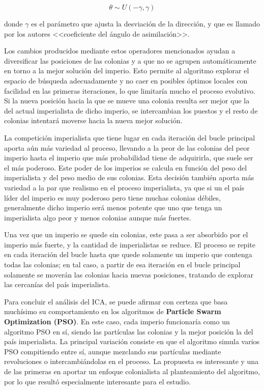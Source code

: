 \begin{equation}\label{ica-eq-desplazamiento2}
	\theta \sim U(-\gamma, \gamma)
\end{equation}

donde $\gamma$ es el parámetro que ajusta la desviación de la dirección, y que es llamado por los autores <<coeficiente del ángulo de asimilación>>.

Los cambios producidos mediante estos operadores mencionados ayudan a diversificar las posiciones de las colonias y a que no se agrupen automáticamente en torno a la mejor solución del imperio. Esto permite al algoritmo explorar el espacio de búsqueda adecuadamente y no caer en posibles óptimos locales con facilidad en las primeras iteraciones, lo que limitaría mucho el proceso evolutivo. Si la nueva posición hacia la que se mueve una colonia resulta ser mejor que la del actual imperialista de dicho imperio, se intercambian los puestos y el resto de colonias intentará moverse hacia la nueva mejor solución.

La competición imperialista que tiene lugar en cada iteración del bucle principal aporta aún más variedad al proceso, llevando a la peor de las colonias del peor imperio hasta el imperio que más probabilidad tiene de adquirirla, que suele ser el más poderoso. Este poder de los imperios se calcula en función del peso del imperialista y del peso medio de sus colonias. Esta decisión también aporta más variedad a la par que realismo en el proceso imperialista, ya que si un el país líder del imperio es muy poderoso pero tiene muchas colonias débiles, generalmente dicho imperio será menos potente que uno que tenga un imperialista algo peor y menos colonias aunque más fuertes.

Una vez que un imperio se quede sin colonias, este pasa a ser absorbido por el imperio más fuerte, y la cantidad de imperialistas se reduce. El proceso se repite en cada iteración del bucle hasta que quede solamente un imperio que contenga todas las colonias; en tal caso, a partir de esa iteración en el bucle principal solamente se moverán las colonias hacia nuevas posiciones, tratando de explorar las cercanías del país imperialista.

Para concluir el análisis del ICA, se puede afirmar con certeza que basa muchísimo su comportamiento en los algoritmos de \textbf{Particle Swarm Optimization (PSO)}. En este caso, cada imperio funcionaría como un algoritmo PSO en sí, siendo las partículas las colonias y la mejor posición la del país imperialista. La principal variación consiste en que el algoritmo simula varios PSO compitiendo entre sí, aunque mezclando sus partículas mediante revoluciones o intercambiándolas en el proceso. La propuesta es interesante y una de las primeras en aportar un enfoque colonialista al planteamiento del algoritmo, por lo que resultó especialmente interesante para el estudio.

